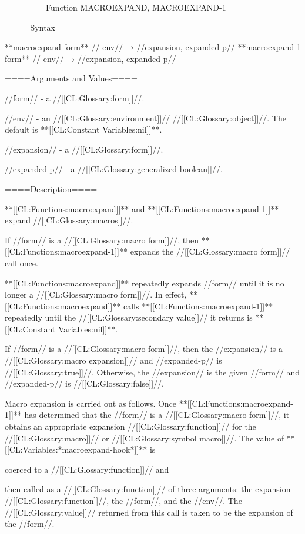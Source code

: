 ====== Function MACROEXPAND, MACROEXPAND-1 ======

====Syntax====

**macroexpand {form** //\opt} env// → //expansion, expanded-p// **macroexpand-1 {form** //\opt} env// → //expansion, expanded-p//

====Arguments and Values====

//form// - a //[[CL:Glossary:form]]//.

//env// - an //[[CL:Glossary:environment]]// //[[CL:Glossary:object]]//. The default is **[[CL:Constant Variables:nil]]**.

//expansion// - a //[[CL:Glossary:form]]//.


//expanded-p// - a //[[CL:Glossary:generalized boolean]]//.


====Description====

**[[CL:Functions:macroexpand]]** and **[[CL:Functions:macroexpand-1]]** expand //[[CL:Glossary:macros]]//.


If //form// is a //[[CL:Glossary:macro form]]//, then **[[CL:Functions:macroexpand-1]]** expands the //[[CL:Glossary:macro form]]// call once.


**[[CL:Functions:macroexpand]]** repeatedly expands //form// until it is no longer a //[[CL:Glossary:macro form]]//. In effect, **[[CL:Functions:macroexpand]]** calls **[[CL:Functions:macroexpand-1]]** repeatedly until the //[[CL:Glossary:secondary value]]// it returns is **[[CL:Constant Variables:nil]]**.

If //form// is a //[[CL:Glossary:macro form]]//, then the //expansion// is a //[[CL:Glossary:macro expansion]]// and //expanded-p// is //[[CL:Glossary:true]]//. Otherwise, the //expansion// is the given //form// and //expanded-p// is //[[CL:Glossary:false]]//.


Macro expansion is carried out as follows. Once **[[CL:Functions:macroexpand-1]]** has determined that the //form// is a //[[CL:Glossary:macro form]]//, it obtains an appropriate expansion //[[CL:Glossary:function]]// for the //[[CL:Glossary:macro]]// or //[[CL:Glossary:symbol macro]]//. The value of **[[CL:Variables:*macroexpand-hook*]]** is

coerced to a //[[CL:Glossary:function]]// and

then called as a //[[CL:Glossary:function]]// of three arguments: the expansion //[[CL:Glossary:function]]//, the //form//, and the //env//. The //[[CL:Glossary:value]]// returned from this call is taken to be the expansion of the //form//.

